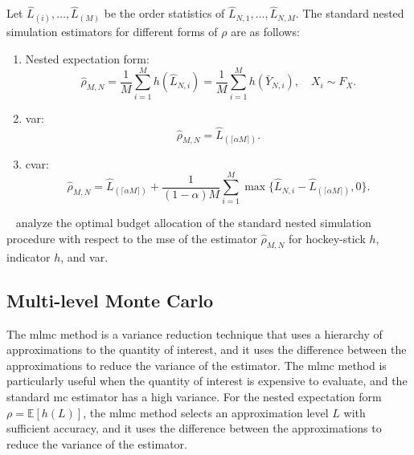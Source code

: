 Let $\hat{L}_{(i)}, \dots, \hat{L}_{(M)}$ be the order statistics of $\hat{L}_{N, 1}, \dots, \hat{L}_{N, M}$. 
The standard nested simulation estimators for different forms of $\rho$ are as follows:

\begin{enumerate}
    \item   Nested expectation form:
            \begin{equation*}
                \hat{\rho}_{M, N} = \frac{1}{M} \sum_{i=1}^M h(\hat{L}_{N, i}) = \frac{1}{M} \sum_{i=1}^M h(\bar{Y}_{N, i}), \quad X_i \sim F_X.
            \end{equation*}
    \item   \gls{var}:
            \begin{equation*}
                \hat{\rho}_{M, N} = \hat{L}_{(\lceil \alpha M \rceil)}.
            \end{equation*}

    \item   \gls{cvar}:
            \begin{equation}\label{eq1:cvar-hat}
                \hat{\rho}_{M, N} = \hat{L}_{(\lceil \alpha M \rceil)} + \frac{1}{(1-\alpha) M} \sum_{i=1}^M \max \{\hat{L}_{N, i} - \hat{L}_{(\lceil \alpha M \rceil)}, 0 \}.
            \end{equation}
\end{enumerate}

~\cite{gordy2010nested} analyze the optimal budget allocation of the standard nested simulation procedure with respect to the \gls{mse} of the estimator $\hat{\rho}_{M, N}$ for hockey-stick $h$, indicator $h$, and \gls{var}.

\subsection{Multi-level Monte Carlo}

The \gls{mlmc} method is a variance reduction technique that uses a hierarchy of approximations to the quantity of interest, and it uses the difference between the approximations to reduce the variance of the estimator.
The \gls{mlmc} method is particularly useful when the quantity of interest is expensive to evaluate, and the standard \gls{mc} estimator has a high variance.
For the nested expectation form $\rho = \mathbb{E}[h(L)]$, the \gls{mlmc} method selects an approximation level $L$ with sufficient accuracy, and it uses the difference between the approximations to reduce the variance of the estimator.

